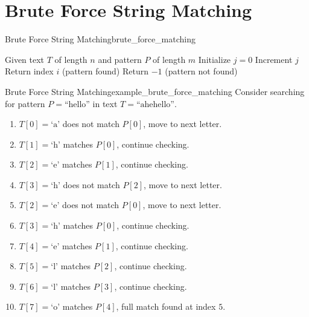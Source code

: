 
\section{Brute Force String Matching}
\begin{algorithmtcb}
    {Brute Force String Matching}{brute_force_matching}
    \begin{algorithmic}
        \State Given text $T$ of length $n$ and pattern $P$ of length $m$
          
            \State Initialize $j = 0$
                \State Increment $j$
            \EndWhile
                \State Return index $i$ (pattern found)
            \EndIf
        \EndFor
        \State Return $-1$ (pattern not found)
    \end{algorithmic}
\end{algorithmtcb}

\begin{exampletcb}
    {Brute Force String Matching}{example_brute_force_matching}
    Consider searching for pattern $P = \text{``hello''}$ in text $T = \text{``ahehello''}$.

    \begin{enumerate}
        \item $T[0] = \text{`a'}$ does not match $P[0]$, move to next letter.
        \item $T[1] = \text{`h'}$ matches $P[0]$, continue checking.
        \item $T[2] = \text{`e'}$ matches $P[1]$, continue checking.
        \item $T[3] = \text{`h'}$ does not match $P[2]$, move to next letter.
        \item $T[2] = \text{`e'}$ does not match $P[0]$, move to next letter.
        \item $T[3] = \text{`h'}$ matches $P[0]$, continue checking.
        \item $T[4] = \text{`e'}$ matches $P[1]$, continue checking.
        \item $T[5] = \text{`l'}$ matches $P[2]$, continue checking.
        \item $T[6] = \text{`l'}$ matches $P[3]$, continue checking.
        \item $T[7] = \text{`o'}$ matches $P[4]$, full match found at index $5$.
    \end{enumerate}
\end{exampletcb}

